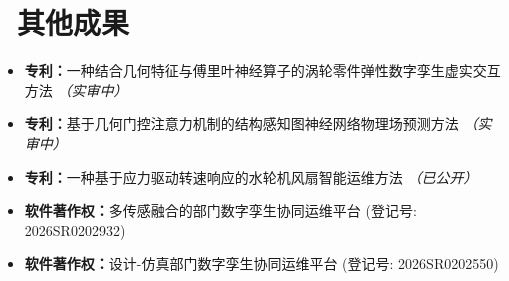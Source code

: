 \documentclass[11pt]{article}
\begin{document}
\section{%
    \makebox[\widthof{\faTrophy}][c]%
    {\color{CVBlue}\faTrophy}\ 其他成果%
}
\begin{itemize}
    \item \textbf{专利：}一种结合几何特征与傅里叶神经算子的涡轮零件弹性数字孪生虚实交互方法 \textit{（实审中）}
    \item \textbf{专利：}基于几何门控注意力机制的结构感知图神经网络物理场预测方法 \textit{（实审中）}
    \item \textbf{专利：}一种基于应力驱动转速响应的水轮机风扇智能运维方法 \textit{（已公开）}
    \item \textbf{软件著作权：}多传感融合的部门数字孪生协同运维平台 (登记号: 2026SR0202932)
    \item \textbf{软件著作权：}设计-仿真部门数字孪生协同运维平台 (登记号: 2026SR0202550)
\end{itemize}

  
    
\end{document}
